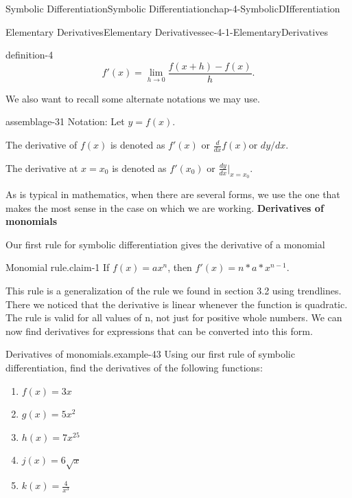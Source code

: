 \documentclass[oneside,10pt,]{book}
\newcommand{\terminology}[1]{\textbf{#1}}
\numberwithin{equation}{section}
\begin{document}
\begin{chapterptx}{Symbolic Differentiation}{}{Symbolic Differentiation}{}{}{chap-4-SymbolicDIfferentiation}
\begin{sectionptx}{Elementary Derivatives}{}{Elementary Derivatives}{}{}{sec-4-1-ElementaryDerivatives}
\begin{definition}{}{definition-4}
\begin{equation*}
f'(x )=\lim_{h\to 0}\frac{f(x+h)-f(x)}{h}.
\end{equation*}
%
\end{definition}
\hypertarget{p-1422}{}%
We also want to recall some alternate notations we may use.%
\begin{assemblage}{}{assemblage-31}%
\hypertarget{p-1423}{}%
Notation:  Let \(y=f(x)\).%
\par
\hypertarget{p-1424}{}%
The derivative of \(f(x)\)  is denoted as \(f'(x)\) or  \(\frac{d}{dx} f(x) \)or \(dy/dx\).%
\par
\hypertarget{p-1425}{}%
The derivative at \(x=x_0\) is denoted as \(f'(x_0 )\) or \(\frac{dy}{dx}|_{x=x_0}\).%
\end{assemblage}
\hypertarget{p-1426}{}%
As is typical in mathematics, when there are several forms, we use the one that makes the most sense in the case on which we are working.%
\terminology{Derivatives of monomials}\begin{introduction}{}%
\hypertarget{p-1427}{}%
Our first rule for symbolic differentiation gives the derivative of a monomial%
\end{introduction}%
\begin{claim}{Monomial rule.}{}{claim-1}%
\hypertarget{p-1428}{}%
If \(f(x)=a x^n\), then \(f'(x)=n*a*x^{n-1}\).%
\end{claim}
\hypertarget{p-1429}{}%
This rule is a generalization of the rule we found in section 3.2 using trendlines.  There we noticed that the derivative is linear whenever the function is quadratic.  The rule is valid for all values of n, not just for positive whole numbers. We can now find derivatives for expressions that can be converted into this form.%
\begin{example}{Derivatives of monomials.}{example-43}%
\hypertarget{p-1430}{}%
Using our first rule of symbolic differentiation, find the derivatives of the following functions:%
\leavevmode%
\begin{enumerate}[label=(\alph*)]
\item\hypertarget{li-449}{}\(f(x)=3 x\)%
\item\hypertarget{li-450}{}\(g(x)=5 x^2\)%
\item\hypertarget{li-451}{}\(h(x)=7x^{25}\)%
\item\hypertarget{li-452}{}\(j(x)=6 \sqrt{x}\)%
\item\hypertarget{li-453}{}\(k(x)=\frac{4}{x^3} \)%
\end{enumerate}
\hypertarget{p-1431}{}%

\end{example}
\end{sectionptx}
\end{chapterptx}
\end{document}
